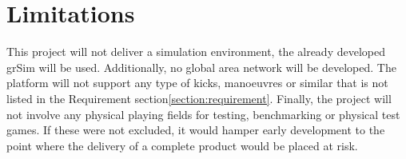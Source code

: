 \section{Limitations}
\label{section:limiations}

This project will not deliver a simulation environment, the already developed grSim will be used. Additionally, no global area network will be developed. The platform will not support any type of kicks, manoeuvres or similar that is not listed in the Requirement section\:\ref{section:requirement}. Finally, the project will not involve any physical playing fields for testing, benchmarking or physical test games.
If these were not excluded, it would hamper early development to the point where the delivery of a complete product would be placed at risk.



